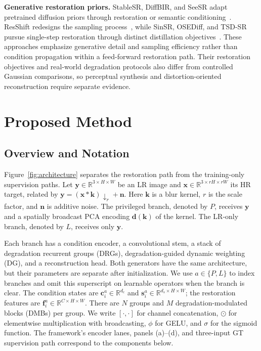 \documentclass[10pt,journal,letterpaper]{IEEEtran}
\begin{document}
\noindent\textbf{Generative restoration priors.}
StableSR, DiffBIR, and SeeSR adapt pretrained diffusion priors through restoration or semantic conditioning~\cite{wang2024stablesr,lin2024diffbir,wu2024seesr}. ResShift redesigns the sampling process~\cite{yue2023resshift}, while SinSR, OSEDiff, and TSD-SR pursue single-step restoration through distinct distillation objectives~\cite{wang2024sinsr,wu2024osediff,dong2025tsdsr}. These approaches emphasize generative detail and sampling efficiency rather than condition propagation within a feed-forward restoration path. Their restoration objectives and real-world degradation protocols also differ from controlled Gaussian comparisons, so perceptual synthesis and distortion-oriented reconstruction require separate evidence.


\section{Proposed Method}
\label{sec:method}

\subsection{Overview and Notation}
\label{sec:overview}

Figure~\ref{fig:architecture} separates the restoration path from the training-only supervision paths. Let $\mathbf y\in\mathbb R^{3\times H\times W}$ be an LR image and $\mathbf x\in\mathbb R^{3\times rH\times rW}$ its HR target, related by $\mathbf y=(\mathbf x*\mathbf k)\!\downarrow_r+\mathbf n$. Here $\mathbf k$ is a blur kernel, $r$ is the scale factor, and $\mathbf n$ is additive noise. The privileged branch, denoted by $P$, receives $\mathbf y$ and a spatially broadcast PCA encoding $\mathbf d(\mathbf k)$ of the kernel. The LR-only branch, denoted by $L$, receives only $\mathbf y$.

Each branch has a condition encoder, a convolutional stem, a stack of degradation recurrent groups (DRGs), degradation-guided dynamic weighting (DG), and a reconstruction head. Both generators have the same architecture, but their parameters are separate after initialization. We use $a\in\{P,L\}$ to index branches and omit this superscript on learnable operators when the branch is clear. The condition states are $\mathbf c_i^a\in\mathbb R^{d_c}$ and $\mathbf s_i^a\in\mathbb R^{d_s\times H\times W}$; the restoration features are $\mathbf f_i^a\in\mathbb R^{C\times H\times W}$. There are $N$ groups and $M$ degradation-modulated blocks (DMBs) per group. We write $[\cdot,\cdot]$ for channel concatenation, $\odot$ for elementwise multiplication with broadcasting, $\phi$ for GELU, and $\sigma$ for the sigmoid function. The framework's encoder lanes, panels (a)--(d), and three-input GT supervision path correspond to the components below.
\end{document}
